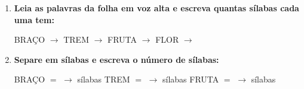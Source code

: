 \begin{exercicio}
\begin{enumerate}[resume]
  \item \textbf{Leia as palavras da folha em voz alta e escreva quantas sílabas cada uma tem:}

  \begin{center}
  BRAÇO $\rightarrow$ \underline{\hspace{1cm}} \quad TREM $\rightarrow$ \underline{\hspace{1cm}} \quad FRUTA $\rightarrow$ \underline{\hspace{1cm}} \quad FLOR $\rightarrow$ \underline{\hspace{1cm}}
  \end{center}

  \item \textbf{Separe em sílabas e escreva o número de sílabas:}
  \begin{center}
  BRAÇO $=$ \underline{\hspace{1.2cm}} $\rightarrow$ \underline{\hspace{0.8cm}} sílabas \quad TREM $=$ \underline{\hspace{1.2cm}} $\rightarrow$ \underline{\hspace{0.8cm}} sílabas \quad FRUTA $=$ \underline{\hspace{1.2cm}} $\rightarrow$ \underline{\hspace{0.8cm}} sílabas
  \end{center}

\end{enumerate}

\end{exercicio}



